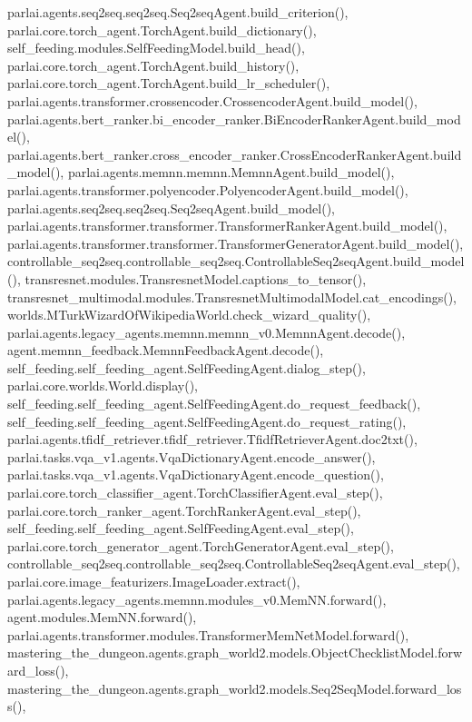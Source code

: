 parlai.\+agents.\+seq2seq.\+seq2seq.\+Seq2seq\+Agent.\+build\+\_\+criterion(), parlai.\+core.\+torch\+\_\+agent.\+Torch\+Agent.\+build\+\_\+dictionary(), self\+\_\+feeding.\+modules.\+Self\+Feeding\+Model.\+build\+\_\+head(), parlai.\+core.\+torch\+\_\+agent.\+Torch\+Agent.\+build\+\_\+history(), parlai.\+core.\+torch\+\_\+agent.\+Torch\+Agent.\+build\+\_\+lr\+\_\+scheduler(), parlai.\+agents.\+transformer.\+crossencoder.\+Crossencoder\+Agent.\+build\+\_\+model(), parlai.\+agents.\+bert\+\_\+ranker.\+bi\+\_\+encoder\+\_\+ranker.\+Bi\+Encoder\+Ranker\+Agent.\+build\+\_\+model(), parlai.\+agents.\+bert\+\_\+ranker.\+cross\+\_\+encoder\+\_\+ranker.\+Cross\+Encoder\+Ranker\+Agent.\+build\+\_\+model(), parlai.\+agents.\+memnn.\+memnn.\+Memnn\+Agent.\+build\+\_\+model(), parlai.\+agents.\+transformer.\+polyencoder.\+Polyencoder\+Agent.\+build\+\_\+model(), parlai.\+agents.\+seq2seq.\+seq2seq.\+Seq2seq\+Agent.\+build\+\_\+model(), parlai.\+agents.\+transformer.\+transformer.\+Transformer\+Ranker\+Agent.\+build\+\_\+model(), parlai.\+agents.\+transformer.\+transformer.\+Transformer\+Generator\+Agent.\+build\+\_\+model(), controllable\+\_\+seq2seq.\+controllable\+\_\+seq2seq.\+Controllable\+Seq2seq\+Agent.\+build\+\_\+model(), transresnet.\+modules.\+Transresnet\+Model.\+captions\+\_\+to\+\_\+tensor(), transresnet\+\_\+multimodal.\+modules.\+Transresnet\+Multimodal\+Model.\+cat\+\_\+encodings(), worlds.\+M\+Turk\+Wizard\+Of\+Wikipedia\+World.\+check\+\_\+wizard\+\_\+quality(), parlai.\+agents.\+legacy\+\_\+agents.\+memnn.\+memnn\+\_\+v0.\+Memnn\+Agent.\+decode(), agent.\+memnn\+\_\+feedback.\+Memnn\+Feedback\+Agent.\+decode(), self\+\_\+feeding.\+self\+\_\+feeding\+\_\+agent.\+Self\+Feeding\+Agent.\+dialog\+\_\+step(), parlai.\+core.\+worlds.\+World.\+display(), self\+\_\+feeding.\+self\+\_\+feeding\+\_\+agent.\+Self\+Feeding\+Agent.\+do\+\_\+request\+\_\+feedback(), self\+\_\+feeding.\+self\+\_\+feeding\+\_\+agent.\+Self\+Feeding\+Agent.\+do\+\_\+request\+\_\+rating(), parlai.\+agents.\+tfidf\+\_\+retriever.\+tfidf\+\_\+retriever.\+Tfidf\+Retriever\+Agent.\+doc2txt(), parlai.\+tasks.\+vqa\+\_\+v1.\+agents.\+Vqa\+Dictionary\+Agent.\+encode\+\_\+answer(), parlai.\+tasks.\+vqa\+\_\+v1.\+agents.\+Vqa\+Dictionary\+Agent.\+encode\+\_\+question(), parlai.\+core.\+torch\+\_\+classifier\+\_\+agent.\+Torch\+Classifier\+Agent.\+eval\+\_\+step(), parlai.\+core.\+torch\+\_\+ranker\+\_\+agent.\+Torch\+Ranker\+Agent.\+eval\+\_\+step(), self\+\_\+feeding.\+self\+\_\+feeding\+\_\+agent.\+Self\+Feeding\+Agent.\+eval\+\_\+step(), parlai.\+core.\+torch\+\_\+generator\+\_\+agent.\+Torch\+Generator\+Agent.\+eval\+\_\+step(), controllable\+\_\+seq2seq.\+controllable\+\_\+seq2seq.\+Controllable\+Seq2seq\+Agent.\+eval\+\_\+step(), parlai.\+core.\+image\+\_\+featurizers.\+Image\+Loader.\+extract(), parlai.\+agents.\+legacy\+\_\+agents.\+memnn.\+modules\+\_\+v0.\+Mem\+N\+N.\+forward(), agent.\+modules.\+Mem\+N\+N.\+forward(), parlai.\+agents.\+transformer.\+modules.\+Transformer\+Mem\+Net\+Model.\+forward(), mastering\+\_\+the\+\_\+dungeon.\+agents.\+graph\+\_\+world2.\+models.\+Object\+Checklist\+Model.\+forward\+\_\+loss(), mastering\+\_\+the\+\_\+dungeon.\+agents.\+graph\+\_\+world2.\+models.\+Seq2\+Seq\+Model.\+forward\+\_\+loss(), 